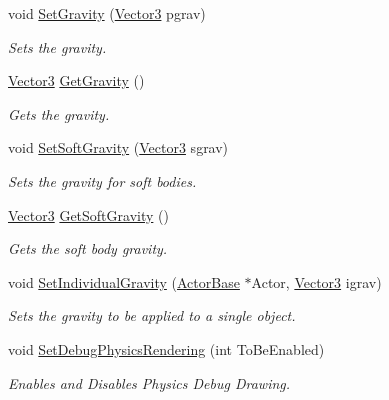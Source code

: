 \begin{DoxyCompactItemize}
void \hyperlink{classphys_1_1PhysicsManager_a3e74f3e0288706d44dc90657a8fa1118}{SetGravity} (\hyperlink{classphys_1_1Vector3}{Vector3} pgrav)
\begin{DoxyCompactList}\small\item\em Sets the gravity. \item\end{DoxyCompactList}\item 
\hyperlink{classphys_1_1Vector3}{Vector3} \hyperlink{classphys_1_1PhysicsManager_a880950ca6093afd3267dcadf30934574}{GetGravity} ()
\begin{DoxyCompactList}\small\item\em Gets the gravity. \item\end{DoxyCompactList}\item 
void \hyperlink{classphys_1_1PhysicsManager_acd1fe36f7cd593da0c466002304065eb}{SetSoftGravity} (\hyperlink{classphys_1_1Vector3}{Vector3} sgrav)
\begin{DoxyCompactList}\small\item\em Sets the gravity for soft bodies. \item\end{DoxyCompactList}\item 
\hyperlink{classphys_1_1Vector3}{Vector3} \hyperlink{classphys_1_1PhysicsManager_acdaad0849c3d6386e8cff5c98fc46664}{GetSoftGravity} ()
\begin{DoxyCompactList}\small\item\em Gets the soft body gravity. \item\end{DoxyCompactList}\item 
void \hyperlink{classphys_1_1PhysicsManager_af6acab3a35e52b1e25f1ab47f494d90d}{SetIndividualGravity} (\hyperlink{classphys_1_1ActorBase}{ActorBase} $\ast$Actor, \hyperlink{classphys_1_1Vector3}{Vector3} igrav)
\begin{DoxyCompactList}\small\item\em Sets the gravity to be applied to a single object. \item\end{DoxyCompactList}\item 
void \hyperlink{classphys_1_1PhysicsManager_a67fb59148a94ced0a92b288a638f89db}{SetDebugPhysicsRendering} (int ToBeEnabled)
\begin{DoxyCompactList}\small\item\em Enables and Disables Physics Debug Drawing. \item\end{DoxyCompactList}\item 

\end{DoxyCompactItemize}
